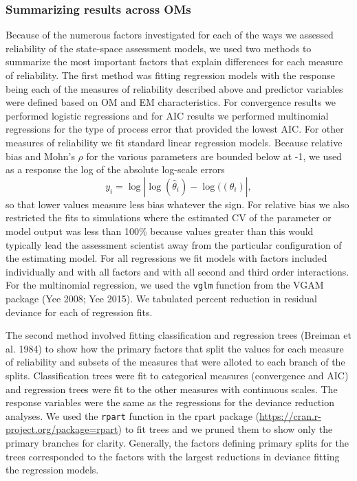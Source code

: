 \documentclass[
  12pt,
]{article}
\begin{document}
\hypertarget{summarizing-results-across-oms}{%
\subsubsection*{Summarizing results across
OMs}\label{summarizing-results-across-oms}}

Because of the numerous factors investigated for each of the ways we
assessed reliability of the state-space assessment models, we used two
methods to summarize the most important factors that explain differences
for each measure of reliability. The first method was fitting regression
models with the response being each of the measures of reliability
described above and predictor variables were defined based on OM and EM
characteristics. For convergence results we performed logistic
regressions and for AIC results we performed multinomial regressions for
the type of process error that provided the lowest AIC. For other
measures of reliability we fit standard linear regression models.
Because relative bias and Mohn's \(\rho\) for the various parameters are
bounded below at -1, we used as a response the log of the absolute
log-scale errors \begin{equation}\label{bias_regression_response}
y_i = \log\left|\log\left(\widehat \theta_i\right) - \log(\left(\theta_i\right)\right|,
\end{equation} so that lower values measure less bias whatever the sign.
For relative bias we also restricted the fits to simulations where the
estimated CV of the parameter or model output was less than 100\%
because values greater than this would typically lead the assessment
scientist away from the particular configuration of the estimating
model. For all regressions we fit models with factors included
individually and with all factors and with all second and third order
interactions. For the multinomial regression, we used the \verb|vglm|
function from the VGAM package (Yee 2008; Yee 2015). We tabulated
percent reduction in residual deviance for each of regression fits.

The second method involved fitting classification and regression trees
(Breiman et al. 1984) to show how the primary factors that split the
values for each measure of reliability and subsets of the measures that
were alloted to each branch of the splits. Classification trees were fit
to categorical measures (convergence and AIC) and regression trees were
fit to the other measures with continuous scales. The response variables
were the same as the regressions for the deviance reduction analyses. We
used the \verb|rpart| function in the rpart package
(\url{https://cran.r-project.org/package=rpart}) to fit trees and we
pruned them to show only the primary branches for clarity. Generally,
the factors defining primary splits for the trees corresponded to the
factors with the largest reductions in deviance fitting the regression
models.
\end{document}
